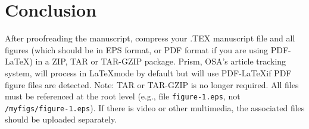 \documentclass[10pt,letterpaper]{article}
\begin{document}
\section{Conclusion}
After proofreading the manuscript, compress your .TEX manuscript file and all figures (which should be in EPS format, or PDF format if you are using PDF-\LaTeX) in a ZIP, TAR or TAR-GZIP package. Prism, OSA’s article tracking system, will process in \LaTeX mode by default but will use PDF-\LaTeX if PDF figure files are detected. Note: TAR or TAR-GZIP is no longer required. All files must be referenced at the root level (e.g., file \texttt{figure-1.eps}, not \texttt{/myfigs/figure-1.eps}). If there is video or other multimedia, the associated files should be uploaded separately.
\end{document}
